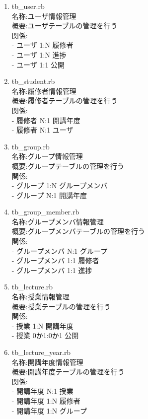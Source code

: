 \begin{enumerate}

\item tb\_user.rb\\
名称:ユーザ情報管理\\
概要:ユーザテーブルの管理を行う\\
関係:\\
- ユーザ 1:N 履修者\\
- ユーザ 1:N 進捗\\
- ユーザ 1:1 公開

\item tb\_student.rb\\
名称:履修者情報管理\\
概要:履修者テーブルの管理を行う\\
関係:\\
- 履修者 N:1 開講年度\\
- 履修者 N:1 ユーザ

\item tb\_group.rb\\
名称:グループ情報管理\\
概要:グループテーブルの管理を行う\\
関係:\\
- グループ 1:N グループメンバ\\
- グループ N:1 開講年度

\item tb\_group\_member.rb\\
名称:グループメンバ情報管理\\
概要:グループメンバテーブルの管理を行う\\
関係:\\
- グループメンバ N:1 グループ\\
- グループメンバ 1:1 履修者\\
- グループメンバ 1:1 進捗

\item tb\_lecture.rb\\
名称:授業情報管理\\
概要:授業テーブルの管理を行う\\
関係:\\
- 授業 1:N 開講年度\\
- 授業 0か1:0か1 公開

\item tb\_lecture\_year.rb\\
名称:開講年度情報管理\\
概要:開講年度テーブルの管理を行う\\
関係:\\
- 開講年度 N:1 授業\\
- 開講年度 1:N 履修者\\
- 開講年度 1:N グループ


\end{enumerate}
